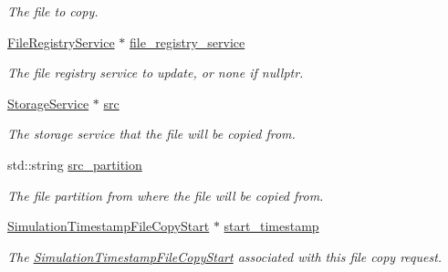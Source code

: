 \begin{DoxyCompactItemize}
\begin{DoxyCompactList}\small\item\em The file to copy. \end{DoxyCompactList}\item 
\mbox{\label{classwrench_1_1_storage_service_file_copy_request_message_ac61ff4397cfdcf7b47b129e5df816f1f}} 
\hyperlink{classwrench_1_1_file_registry_service}{File\+Registry\+Service} $\ast$ \hyperlink{classwrench_1_1_storage_service_file_copy_request_message_ac61ff4397cfdcf7b47b129e5df816f1f}{file\+\_\+registry\+\_\+service}
\begin{DoxyCompactList}\small\item\em The file registry service to update, or none if nullptr. \end{DoxyCompactList}\item 
\mbox{\label{classwrench_1_1_storage_service_file_copy_request_message_aa8d551b56e8e5f3629f0df4026d9ef28}} 
\hyperlink{classwrench_1_1_storage_service}{Storage\+Service} $\ast$ \hyperlink{classwrench_1_1_storage_service_file_copy_request_message_aa8d551b56e8e5f3629f0df4026d9ef28}{src}
\begin{DoxyCompactList}\small\item\em The storage service that the file will be copied from. \end{DoxyCompactList}\item 
\mbox{\label{classwrench_1_1_storage_service_file_copy_request_message_a3849e45e3a00efd5f9230f78bbfeb4b5}} 
std\+::string \hyperlink{classwrench_1_1_storage_service_file_copy_request_message_a3849e45e3a00efd5f9230f78bbfeb4b5}{src\+\_\+partition}
\begin{DoxyCompactList}\small\item\em The file partition from where the file will be copied from. \end{DoxyCompactList}\item 
\mbox{\label{classwrench_1_1_storage_service_file_copy_request_message_a2189608fcbd069bade2206ebe6ff4611}} 
\hyperlink{classwrench_1_1_simulation_timestamp_file_copy_start}{Simulation\+Timestamp\+File\+Copy\+Start} $\ast$ \hyperlink{classwrench_1_1_storage_service_file_copy_request_message_a2189608fcbd069bade2206ebe6ff4611}{start\+\_\+timestamp}
\begin{DoxyCompactList}\small\item\em The \hyperlink{classwrench_1_1_simulation_timestamp_file_copy_start}{Simulation\+Timestamp\+File\+Copy\+Start} associated with this file copy request. \end{DoxyCompactList}\end{DoxyCompactItemize}
